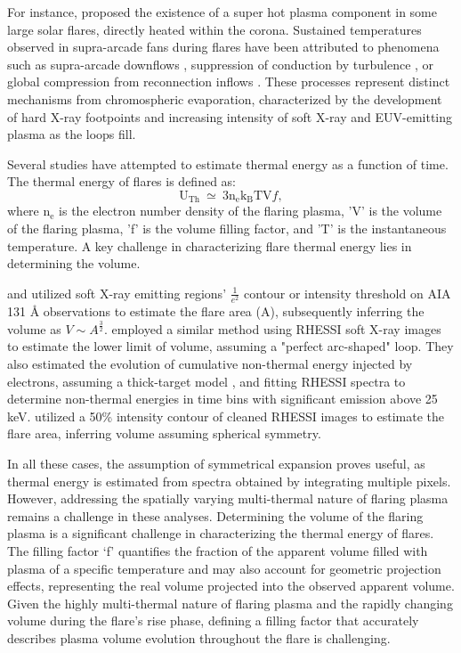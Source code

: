 For instance, \citet{longcope11} proposed the existence of a super hot plasma component in some large solar flares, directly heated within the corona. Sustained temperatures observed in supra-arcade fans during flares have been attributed to phenomena such as supra-arcade downflows \citep[e.g.,][]{reeves17}, suppression of conduction by turbulence \citep[e.g.,][]{xie23}, or global compression from reconnection inflows \citep[e.g.,][]{reeves19}. These processes represent distinct mechanisms from chromospheric evaporation, characterized by the development of hard X-ray footpoints and increasing intensity of soft X-ray and EUV-emitting plasma as the loops fill.

Several studies \citep{hilarie05, caspi10} have attempted to estimate thermal energy as a function of time. The thermal energy of flares is defined as:
\begin{equation}
\mathrm{U_{Th}~\simeq~3n_{e}k_{B}TV}f,
\end{equation} \label{eq:t_eneg_1}
where $\mathrm{n_{e}}$ is the electron number density of the flaring plasma, 'V' is the volume of the flaring plasma, 'f' is the volume filling factor, and 'T' is the instantaneous temperature. A key challenge in characterizing flare thermal energy lies in determining the volume.

\citet{li23} and \citet{zhang19} utilized soft X-ray emitting regions' $\frac{1}{e^{2}}$ contour or intensity threshold on AIA 131 {\AA} observations to estimate the flare area (A), subsequently inferring the volume as $V \sim A^{\frac{3}{2}}$. \citet{hilarie05} employed a similar method using RHESSI soft X-ray images to estimate the lower limit of volume, assuming a "perfect arc-shaped" loop. They also estimated the evolution of cumulative non-thermal energy injected by electrons, assuming a thick-target model \citep{brown71}, and fitting RHESSI spectra to determine non-thermal energies in time bins with significant emission above 25 keV. \citet{caspi10} utilized a 50\% intensity contour of cleaned RHESSI images to estimate the flare area, inferring volume assuming spherical symmetry.

In all these cases, the assumption of symmetrical expansion proves useful, as thermal energy is estimated from spectra obtained by integrating multiple pixels. However, addressing the spatially varying multi-thermal nature of flaring plasma remains a challenge in these analyses. Determining the volume of the flaring plasma is a significant challenge in characterizing the thermal energy of flares. The filling factor `f' quantifies the fraction of the apparent volume filled with plasma of a specific temperature and may also account for geometric projection effects, representing the real volume projected into the observed apparent volume. Given the highly multi-thermal nature of flaring plasma and the rapidly changing volume during the flare's rise phase, defining a filling factor that accurately describes plasma volume evolution throughout the flare is challenging.

